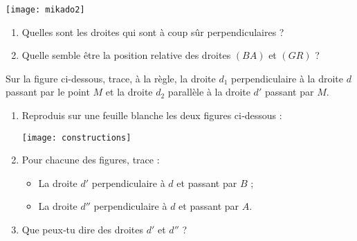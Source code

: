 \begin{exercice}
 \begin{center} \texttt{[image: mikado2]}  \end{center}
\begin{enumerate}
 \item Quelles sont les droites qui sont à coup sûr perpendiculaires ?
 \item Quelle semble être la position relative des droites $(BA)$ et $(GR)$ ?
 \end{enumerate}
\end{exercice}


\begin{exercice}[Quadrillage]
Sur la figure ci-dessous, trace, à la règle, la droite $d_1$ perpendiculaire à la droite $d$ passant par le point $M$ et la droite $d_2$ parallèle à la droite $d'$ passant par $M$.
\begin{center}
\end{center}
\end{exercice}


\begin{exercice}[Constructions]
\begin{enumerate}
 \item Reproduis sur une feuille blanche les deux figures ci‑dessous :
 \begin{center} \texttt{[image: constructions]}  \end{center}
 \item Pour chacune des figures, trace :
  \begin{itemize}
   \item La droite $d'$ perpendiculaire à $d$ et passant par $B$ ;
   \item La droite $d''$ perpendiculaire à $d$ et passant par $A$.
   \end{itemize}
 \item Que peux‑tu dire des droites $d'$ et $d''$ ?
 \end{enumerate}
\end{exercice}



